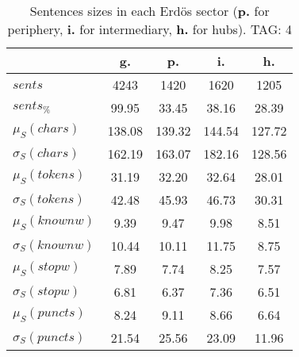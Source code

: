 \begin{table}[h!]
\begin{center}
\begin{tabular}{| l || c | c | c | c |}\hline
 & {\bf g.} & {\bf p.} & {\bf i.} & {\bf h.} \\\hline\hline
$sents$ & 4243  & 1420  & 1620  & 1205 \\
$sents_{\%}$ & 99.95  & 33.45  & 38.16  & 28.39 \\\hline
$\mu_S(chars)$ & 138.08  & 139.32  & 144.54  & 127.72 \\
$\sigma_S(chars)$ & 162.19  & 163.07  & 182.16  & 128.56 \\\hline
$\mu_S(tokens)$ & 31.19  & 32.20  & 32.64  & 28.01 \\
$\sigma_S(tokens)$ & 42.48  & 45.93  & 46.73  & 30.31 \\\hline
$\mu_S(knownw)$ & 9.39  & 9.47  & 9.98  & 8.51 \\
$\sigma_S(knownw)$ & 10.44  & 10.11  & 11.75  & 8.75 \\\hline
$\mu_S(stopw)$ & 7.89  & 7.74  & 8.25  & 7.57 \\
$\sigma_S(stopw)$ & 6.81  & 6.37  & 7.36  & 6.51 \\\hline
$\mu_S(puncts)$ & 8.24  & 9.11  & 8.66  & 6.64 \\
$\sigma_S(puncts)$ & 21.54  & 25.56  & 23.09  & 11.96 \\\hline
\end{tabular}
\caption{Sentences sizes in each Erd\"os sector ({{\bf p.}} for periphery, {{\bf i.}} for intermediary, {{\bf h.}} for hubs). TAG: 4}
\end{center}
\end{table}